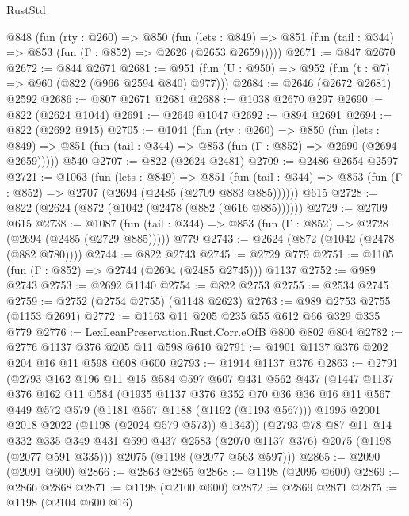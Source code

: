 \begin{lexlean}{RustStd}
\begin{coremodule}
  @848
    (fun (rty : @260) =>
    @850
      (fun (lets : @849) =>
      @851 (fun (tail : @344) => @853 (fun (Γ : @852) => @2626 (@2653 @2659)))))
@2671 := @847 @2670
@2672 := @844 @2671
@2681 := @951 (fun (U : @950) => @952 (fun (t : @7) => @960 (@822 (@966 @2594 @840) @977)))
@2684 := @2646 (@2672 @2681) @2592
@2686 := @807 @2671 @2681
@2688 := @1038 @2670 @297
@2690 := @822 (@2624 @1044)
@2691 := @2649 @1047
@2692 := @894 @2691
@2694 := @822 (@2692 @915)
@2705 := @1041
    (fun (rty : @260) =>
    @850
      (fun (lets : @849) =>
      @851 (fun (tail : @344) => @853 (fun (Γ : @852) => @2690 (@2694 @2659)))))
    @540
@2707 := @822 (@2624 @2481)
@2709 := @2486 @2654 @2597
@2721 := @1063
    (fun (lets : @849) =>
    @851 (fun (tail : @344) => @853 (fun (Γ : @852) => @2707 (@2694 (@2485 (@2709 @883 @885))))))
    @615
@2728 := @822 (@2624 (@872 (@1042 (@2478 (@882 (@616 @885))))))
@2729 := @2709 @615
@2738 := @1087
    (fun (tail : @344) => @853 (fun (Γ : @852) => @2728 (@2694 (@2485 (@2729 @885)))))
    @779
@2743 := @2624 (@872 (@1042 (@2478 (@882 @780))))
@2744 := @822 @2743
@2745 := @2729 @779
@2751 := @1105 (fun (Γ : @852) => @2744 (@2694 (@2485 @2745))) @1137
@2752 := @989 @2743
@2753 := @2692 @1140
@2754 := @822 @2753
@2755 := @2534 @2745
@2759 := @2752 (@2754 @2755) (@1148 @2623)
@2763 := @989 @2753 @2755 (@1153 @2691)
@2772 := @1163 @11 @205 @235 @55 @612 @66 @329 @335 @779
@2776 := LexLeanPreservation.Rust.Corr.eOfB @800 @802 @804
@2782 := @2776 @1137 @376 @205 @11 @598 @610
@2791 := @1901 @1137 @376 @202 @204 @16 @11 @598 @608 @600
@2793 := @1914 @1137 @376
@2863 := @2791
    (@2793
      @162
      @196
      @11
      @15
      @584
      @597
      @607
      @431
      @562
      @437
      (@1447
        @1137
        @376
        @162
        @11
        @584
        (@1935
          @1137
          @376
          @352
          @70
          @36
          @36
          @16
          @11
          @567
          @449
          @572
          @579
          (@1181 @567 @1188 (@1192 (@1193 @567)))
          @1995
          @2001
          @2018
          @2022
          (@1198 (@2024 @579 @573))
          @1343))
      (@2793
        @78
        @87
        @11
        @14
        @332
        @335
        @349
        @431
        @590
        @437
        @2583
        (@2070 @1137 @376)
        @2075
        (@1198 (@2077 @591 @335)))
      @2075
      (@1198 (@2077 @563 @597)))
@2865 := @2090 (@2091 @600)
@2866 := @2863 @2865
@2868 := @1198 (@2095 @600)
@2869 := @2866 @2868
@2871 := @1198 (@2100 @600)
@2872 := @2869 @2871
@2875 := @1198 (@2104 @600 @16)

\end{coremodule}
\end{lexlean}
